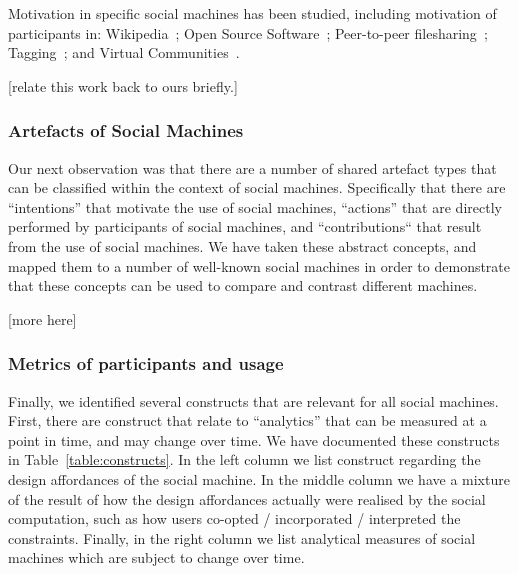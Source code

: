 \documentclass{sig-alternate}
\begin{document}
Motivation in specific social machines has been studied, including motivation of participants
in: Wikipedia~\cite{kuznetsov2006motivations}; Open Source Software~\cite{lakhani2003hackers};
Peer-to-peer filesharing~\cite{p2p}; Tagging~\cite{tagging}; and Virtual
Communities~\cite{ardichvili2003motivation,Moore:2007:UMM:1235000.1235035}.

[relate this work back to ours briefly.]





\subsubsection{Artefacts of Social Machines}

Our next observation was that there are a number of shared artefact types that can be classified within the context of social machines. Specifically that
there are ``intentions'' that motivate the use of social machines, ``actions'' that are directly performed by participants of social machines, and ``contributions``
that result from the use of social machines. We have taken these abstract concepts, and mapped them to a number of well-known social machines in order
to demonstrate that these concepts can be used to compare and contrast different machines.

[more here]


\subsubsection{Metrics of participants and usage}

Finally, we identified several constructs that are relevant for all social machines. First, there are construct that relate to ``analytics'' that can be measured at a point in time, and may change over time. We have documented these constructs in Table~\ref{table:constructs}. In the left column we list construct regarding the design affordances of the social machine. In the middle column we have a mixture of the result of how the design affordances actually were realised by the social computation, such as how users co-opted / incorporated / interpreted the constraints. Finally, in the right column we list analytical measures of social machines which are subject to change over time.
\end{document}
